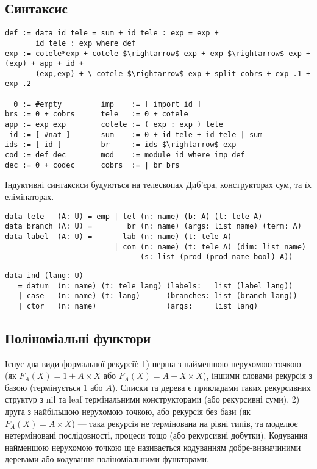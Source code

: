\subsection{Синтаксис}
\begin{lstlisting}[mathescape=true]
def := data id tele = sum + id tele : exp = exp +
       id tele : exp where def
exp := cotele*exp + cotele $\rightarrow$ exp + exp $\rightarrow$ exp + (exp) + app + id +
       (exp,exp) + \ cotele $\rightarrow$ exp + split cobrs + exp .1 + exp .2

  0 := #empty         imp    := [ import id ]
brs := 0 + cobrs      tele   := 0 + cotele
app := exp exp        cotele := ( exp : exp ) tele
 id := [ #nat ]       sum    := 0 + id tele + id tele | sum
ids := [ id ]         br     := ids $\rightarrow$ exp
cod := def dec        mod    := module id where imp def
dec := 0 + codec      cobrs  := | br brs
\end{lstlisting}

Індуктивні синтаксиси будуються на телескопах Диб'єра,
конструкторах сум, та їх елімінаторах.

\begin{lstlisting}
data tele   (A: U) = emp | tel (n: name) (b: A) (t: tele A)
data branch (A: U) =        br (n: name) (args: list name) (term: A)
data label  (A: U) =       lab (n: name) (t: tele A)
                         | com (n: name) (t: tele A) (dim: list name)
                               (s: list (prod (prod name bool) A))
\end{lstlisting}

\begin{lstlisting}
data ind (lang: U)
   = datum  (n: name) (t: tele lang) (labels:   list (label lang))
   | case   (n: name) (t: lang)      (branches: list (branch lang))
   | ctor   (n: name)                (args:     list lang)
\end{lstlisting}

\subsection{Поліноміальні функтори}
Існує два види формальної рекурсії: 1) перша з найменшою нерухомою точкою
(як $F_A(X) = 1 + A \times X$ або $F_A(X) = A + X \times X$), іншими словами
рекурсія з базою (термінується $1$ або $A$). Списки та дерева є
прикладами таких рекурсивних структур з nil та leaf термінальними
конструкторами (або рекурсивні суми).
2) друга з найбільшою нерухомою точкою, або рекурсія без бази
(як $F_A(X) = A \times X$) --- така рекурсія не термінована на рівні типів,
та моделює нетерміновані послідовності, процеси тощо (або рекурсивні добутки).
Кодування найменшою нерухомою точкою ще називається кодуванням
добре-визначиними деревами або кодування поліноміальними функторами.

